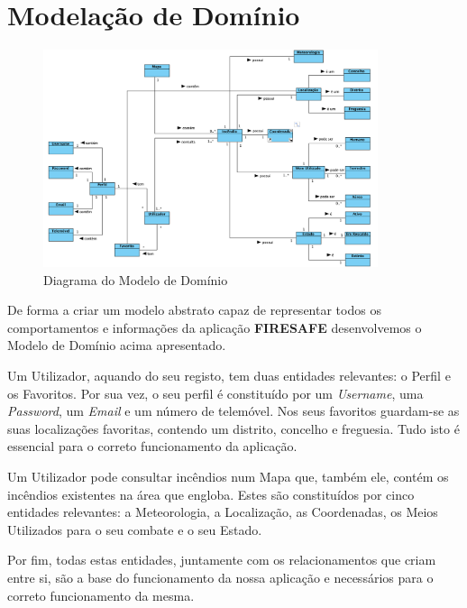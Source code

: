 \documentclass[a4paper,12pt]{scrreprt}
\newcommand{\tab}{
    \hspace{1cm}}
\begin{document}
\chapter{Modelação de Domínio}

\begin{figure}[hbt!]
    \centering
    \includegraphics[width=0.875\textwidth]{images/Fase2/03.ModelacaoDeDominio/modeloDominio.png}
    \caption{Diagrama do Modelo de Domínio}
\end{figure}

\vspace{0.3cm}
\tab De forma a criar um modelo abstrato capaz de representar todos os comportamentos e informações da aplicação \textbf{FIRESAFE} desenvolvemos o Modelo de Domínio acima apresentado.

\tab Um Utilizador, aquando do seu registo, tem duas entidades relevantes: o Perfil e os Favoritos. Por sua vez, o seu perfil é constituído por um \textit{Username}, uma \textit{Password}, um \textit{Email} e um número de telemóvel. Nos seus favoritos guardam-se as suas localizações favoritas, contendo um distrito, concelho e freguesia. Tudo isto é essencial para o correto funcionamento da aplicação.

\tab Um Utilizador pode consultar incêndios num Mapa que, também ele, contém os incêndios existentes na área que engloba. Estes são constituídos por cinco entidades relevantes: a Meteorologia, a Localização, as Coordenadas, os Meios Utilizados para o seu combate e o seu Estado. 

\tab Por fim, todas estas entidades, juntamente com os relacionamentos que criam entre si, são a base do funcionamento da nossa aplicação e necessários para o correto funcionamento da mesma.
\end{document}
